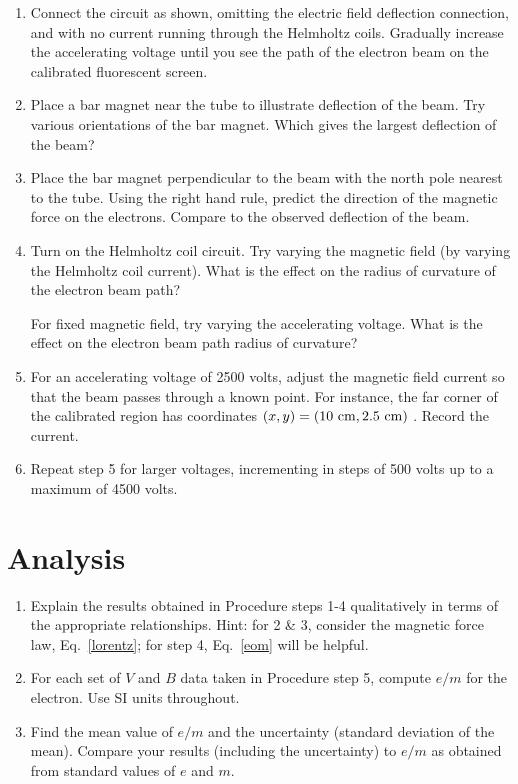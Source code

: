 \documentclass{tufte-handout}
\begin{document}
\begin{enumerate}
\item Connect the circuit as shown, omitting the electric
field deflection connection,  and with no current running through the
Helmholtz coils. Gradually increase the accelerating voltage until you
see the path of the electron beam on the calibrated fluorescent
screen.



\item Place a bar magnet near the tube to illustrate deflection of the beam. Try various orientations of the bar
magnet. Which gives the largest deflection of the beam?


\item Place the bar magnet perpendicular to the beam with the north pole
nearest to the tube. Using the right hand rule, predict the direction
of the magnetic force on the electrons. Compare to the observed
deflection of the beam.


\item Turn on the Helmholtz coil circuit. Try varying the
magnetic field (by varying the Helmholtz coil current). What is the
effect on the radius of curvature of the electron beam path?

For fixed magnetic field, try varying the accelerating voltage. What is
the effect on the electron beam path radius of curvature?


\item For an accelerating voltage of 2500 volts, adjust the magnetic field
  current so that the beam passes through a known point.  For instance, the far
  corner of the calibrated region has coordinates $(x,y) = (10~\rm{cm},
  2.5~\rm{cm})$ . Record the current.


\item Repeat step 5 for larger voltages, incrementing in
steps of 500 volts up to a maximum of 4500 volts.
\end{enumerate}

\section{Analysis}

\begin{enumerate}
\item Explain the results obtained in Procedure steps 1-4 qualitatively
in terms of the appropriate relationships. Hint: for 2 \& 3, consider
the magnetic force law, Eq.~\ref{lorentz}; for step 4, Eq.~\ref{eom} will be helpful.

\item For each set of $V$ and $B$ data taken in Procedure step 5, compute $e/m$
for the electron. Use SI units throughout.

\item Find the mean value of $e/m$ and the uncertainty (standard deviation of
the mean). Compare your results (including the uncertainty) to
$e/m$ as obtained from standard values of $e$ and $m$.
\end{enumerate}
\end{document}
